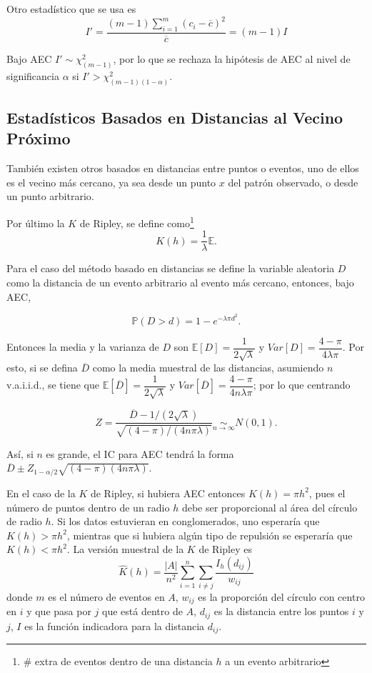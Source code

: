 \documentclass[12,]{article}
\let\rmarkdownfootnote\footnote%
\def\footnote{\protect\rmarkdownfootnote}
\begin{document}
Otro estadístico que se usa es \[
I' =  \dfrac{(m-1)\sum\limits_{i=1}^m (c_i - \overline{c})^2}{\overline{c}} = (m-1)I
\]

Bajo AEC $I' \sim \chi^2_{(m-1)}$, por lo que se rechaza la hipótesis de
AEC al nivel de significancia $\alpha$ si
$I' > \chi^2_{(m-1)(1 - \alpha)}$.

\subsection{Estadísticos Basados en Distancias al Vecino
Próximo}\label{estadisticos-basados-en-distancias-al-vecino-proximo}

También existen otros basados en distancias entre puntos o eventos, uno
de ellos es el vecino más cercano, ya sea desde un punto $x$ del patrón
observado, o desde un punto arbitrario.

Por último la $K$ de Ripley, se define como\footnote{\# extra de eventos
  dentro de una distancia $h$ a un evento arbitrario} \[
K(h) = \dfrac{1}{\lambda} \mathbb{E}.
\]

Para el caso del método basado en distancias se define la variable
aleatoria $D$ como la distancia de un evento arbitrario al evento más
cercano, entonces, bajo AEC,

\[
\mathbb{P}(D>d) = 1 - e^{- \lambda \pi d^2}.
\]

Entonces la media y la varianza de $D$ son
$\mathbb{E}[D] = \dfrac{1}{2 \sqrt{\lambda}}$ y
$Var[D] = \dfrac{4 - \pi}{4 \lambda \pi}$. Por esto, si se defina
$\overline{D}$ como la media muestral de las distancias, asumiendo $n$
v.a.i.i.d., se tiene que
$\mathbb{E}[\overline{D}] = \dfrac{1}{2 \sqrt{\lambda}}$ y
$Var[\overline{D}] = \dfrac{4 - \pi}{4 n \lambda \pi}$; por lo que
centrando

\[
Z = \dfrac{\overline{D} - 1/ (2 \sqrt{\lambda})}{\sqrt{(4-\pi)/(4n\pi\lambda)}} \underset{n \to \infty}{\sim} N(0,1).
\]

Así, si $n$ es grande, el IC para AEC tendrá la forma
$\overline{D} \pm Z_{1- \alpha / 2} \sqrt{(4-\pi)(4n\pi\lambda)}$.

En el caso de la $K$ de Ripley, si hubiera AEC entonces
$K(h) = \pi h^2$, pues el número de puntos dentro de un radio $h$ debe
ser proporcional al área del círculo de radio $h$. Si los datos
estuvieran en conglomerados, uno esperaría que $K(h) > \pi h^2$,
mientras que si hubiera algún tipo de repulsión se esperaría que
$K(h) < \pi h^2$. La versión muestral de la $K$ de Ripley es \[
\hat{K}(h) = \dfrac{\vert A \vert}{n^2} \sum\limits_{i=1}^{n} \sum\limits_{i \neq j}^{} \dfrac{I_h(d_{ij})}{w_{ij}}
\] donde $m$ es el número de eventos en $A$, $w_{ij}$ es la proporción
del círculo con centro en $i$ y que pasa por $j$ que está dentro de $A$,
$d_{ij}$ es la distancia entre los puntos $i$ y $j$, $I$ es la función
indicadora para la distancia $d_{ij}$.
\end{document}

